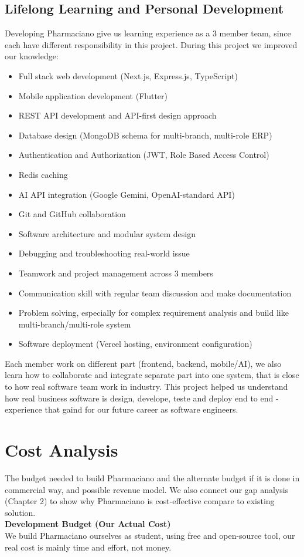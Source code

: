 \subsection{Lifelong Learning and Personal Development}
Developing Pharmaciano give us learning experience as a 3 member team, since each have different responsibility in this project.
During this project we improved our knowledge:
\begin{itemize}
\item Full stack web development (Next.js, Express.js, TypeScript)
\item Mobile application development (Flutter)
\item REST API development and API-first design approach
\item Database design (MongoDB schema for multi-branch, multi-role ERP)
\item Authentication and Authorization (JWT, Role Based Access Control)
\item Redis caching
\item AI API integration (Google Gemini, OpenAI-standard API)
\item Git and GitHub collaboration
\item Software architecture and modular system design
\item Debugging and troubleshooting real-world issue
\item Teamwork and project management across 3 members
\item Communication skill with regular team discussion and make documentation
\item Problem solving, especially for complex requirement analysis and build like multi-branch/multi-role system
\item Software deployment (Vercel hosting, environment configuration)
\end{itemize}
Each member work on different part (frontend, backend, mobile/AI), we also learn how to collaborate and integrate separate part into one system, that is close to how real software team work in industry.
This project helped us understand how real business software is design, develope, teste and deploy end to end - experience that gaind for our future career as software engineers.

\section{Cost Analysis}
The budget needed to build Pharmaciano and the alternate budget if it is done in commercial way, and possible revenue model. We also connect our gap analysis (Chapter 2) to show why Pharmaciano is cost-effective compare to existing solution.\\
\textbf{Development Budget (Our Actual Cost)}\\
We build Pharmaciano ourselves as student, using free and open-source tool, our real cost is mainly time and effort, not money.

